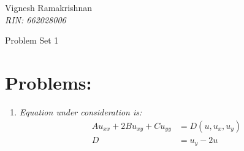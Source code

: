 \documentclass[11pt]{article}
\begin{document}
\begin{flushright}
Vignesh Ramakrishnan \\
\textit{RIN: 662028006}
\end{flushright}

\begin{center}
\large{Problem Set 1}
\end{center}

\section{Problems:}
\begin{enumerate}

\item{\color{red}\textit{Equation under consideration is:}}\\
\begin{align*}
Au_{xx} + 2Bu_{xy} + Cu_{yy} & = D(u, u_x, u_y)\\
D & = u_y - 2u
\end{align*}


\end{enumerate}
\end{document}
